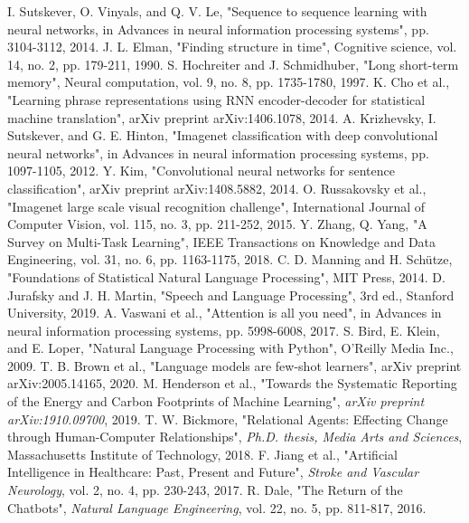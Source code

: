 \documentclass[conference]{IEEEtran}
\begin{document}
\begin{thebibliography}{00}
     I. Sutskever, O. Vinyals, and Q. V. Le, "Sequence to sequence learning with neural networks, in Advances in neural information processing systems", pp. 3104-3112, 2014.
     J. L. Elman, "Finding structure in time", Cognitive science, vol. 14, no. 2, pp. 179-211, 1990.
     S. Hochreiter and J. Schmidhuber, "Long short-term memory", Neural computation, vol. 9, no. 8, pp. 1735-1780, 1997.
     K. Cho et al., "Learning phrase representations using RNN encoder-decoder for statistical machine translation", arXiv preprint arXiv:1406.1078, 2014.
     A. Krizhevsky, I. Sutskever, and G. E. Hinton, "Imagenet classification with deep convolutional neural networks", in Advances in neural information processing systems, pp. 1097-1105, 2012.
     Y. Kim, "Convolutional neural networks for sentence classification", arXiv preprint arXiv:1408.5882, 2014.
     O. Russakovsky et al., "Imagenet large scale visual recognition challenge", International Journal of Computer Vision, vol. 115, no. 3, pp. 211-252, 2015.
     Y. Zhang, Q. Yang, "A Survey on Multi-Task Learning", IEEE Transactions on Knowledge and Data Engineering, vol. 31, no. 6, pp. 1163-1175, 2018.
     C. D. Manning and H. Schütze, "Foundations of Statistical Natural Language Processing", MIT Press, 2014.
     D. Jurafsky and J. H. Martin, "Speech and Language Processing", 3rd ed., Stanford University, 2019.
     A. Vaswani et al., "Attention is all you need", in Advances in neural information processing systems, pp. 5998-6008, 2017.
     S. Bird, E. Klein, and E. Loper, "Natural Language Processing with Python", O'Reilly Media Inc., 2009.
     T. B. Brown et al., "Language models are few-shot learners", arXiv preprint arXiv:2005.14165, 2020.
     M. Henderson et al., "Towards the Systematic Reporting of the Energy and Carbon Footprints of Machine Learning", \textit{arXiv preprint arXiv:1910.09700}, 2019.
     T. W. Bickmore, "Relational Agents: Effecting Change through Human-Computer Relationships", \textit{Ph.D. thesis, Media Arts and Sciences}, Massachusetts Institute of Technology, 2018.
     F. Jiang et al., "Artificial Intelligence in Healthcare: Past, Present and Future", \textit{Stroke and Vascular Neurology}, vol. 2, no. 4, pp. 230-243, 2017.
     R. Dale, "The Return of the Chatbots", \textit{Natural Language Engineering}, vol. 22, no. 5, pp. 811-817, 2016.

\end{thebibliography}
\end{document}
